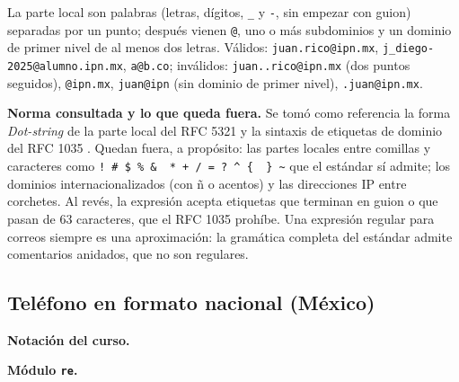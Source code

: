 La parte local son palabras (letras, dígitos, \texttt{\_} y \texttt{-}, sin empezar con guion) separadas por un punto; después vienen \texttt{@}, uno o más subdominios y un dominio de primer nivel de al menos dos letras. Válidos: \texttt{juan.rico@ipn.mx}, \texttt{j\_diego-2025@alumno.ipn.mx}, \texttt{a@b.co}; inválidos: \texttt{juan..rico@ipn.mx} (dos puntos seguidos), \texttt{@ipn.mx}, \texttt{juan@ipn} (sin dominio de primer nivel), \texttt{.juan@ipn.mx}.

\textbf{Norma consultada y lo que queda fuera.} Se tomó como referencia la forma \emph{Dot-string} de la parte local del RFC 5321 \autocite[sec.~4.1.2]{rfc5321} y la sintaxis de etiquetas de dominio del RFC 1035 \autocite[sec.~2.3.1]{rfc1035}. Quedan fuera, a propósito: las partes locales entre comillas y caracteres como \texttt{!\ \#\ \$\ \%\ \&\ \textquotesingle{}\ *\ +\ /\ =\ ?\ \^{}\ \{\ \textbar{}\ \}\ \textasciitilde{}} que el estándar sí admite; los dominios internacionalizados (con ñ o acentos) y las direcciones IP entre corchetes. Al revés, la expresión acepta etiquetas que terminan en guion o que pasan de 63 caracteres, que el RFC 1035 prohíbe. Una expresión regular para correos siempre es una aproximación: la gramática completa del estándar admite comentarios anidados, que no son regulares.

\hypertarget{teluxe9fono-en-formato-nacional-muxe9xico}{%
\subsection{Teléfono en formato nacional (México)}\label{teluxe9fono-en-formato-nacional-muxe9xico}}

\textbf{Notación del curso.}

\begin{Shaded}
\begin{Highlighting}[]
\NormalTok{          + [D][D][D]{-}[D][D][D]{-}[D][D][D][D] + \textbackslash{}([D][D]\textbackslash{})[D][D][D][D]{-}[D][D][D][D])}
\end{Highlighting}
\end{Shaded}

\textbf{Módulo \texttt{re}.}

\begin{Shaded}
\begin{Highlighting}[]
\end{Highlighting}
\end{Shaded}

